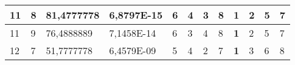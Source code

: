 \documentclass[conference]{IEEEtran}
\begin{document}
\begin{table*}[]
\begin{tabular}{|llll|llllllll|}
\multicolumn{1}{|l|}{11}                                                    & \multicolumn{1}{l|}{8}                                                        & \multicolumn{1}{l|}{81,4777778}                                                   & 6,8797E-15                     & \multicolumn{1}{l|}{6}                                                  & \multicolumn{1}{l|}{4}                                                  & \multicolumn{1}{l|}{3}                                                  & \multicolumn{1}{l|}{8}                                                  & \multicolumn{1}{l|}{\textbf{1}}                                         & \multicolumn{1}{l|}{2}                                                  & \multicolumn{1}{l|}{5}                                                  & 7                          \\ \hline
\multicolumn{1}{|l|}{11}                                                    & \multicolumn{1}{l|}{9}                                                        & \multicolumn{1}{l|}{76,4888889}                                                   & 7,1458E-14                     & \multicolumn{1}{l|}{6}                                                  & \multicolumn{1}{l|}{3}                                                  & \multicolumn{1}{l|}{4}                                                  & \multicolumn{1}{l|}{8}                                                  & \multicolumn{1}{l|}{\textbf{1}}                                         & \multicolumn{1}{l|}{2}                                                  & \multicolumn{1}{l|}{5}                                                  & 7                          \\ \hline
\multicolumn{1}{|l|}{12}                                                    & \multicolumn{1}{l|}{7}                                                        & \multicolumn{1}{l|}{51,7777778}                                                   & 6,4579E-09                     & \multicolumn{1}{l|}{5}                                                  & \multicolumn{1}{l|}{4}                                                  & \multicolumn{1}{l|}{2}                                                  & \multicolumn{1}{l|}{7}                                                  & \multicolumn{1}{l|}{\textbf{1}}                                         & \multicolumn{1}{l|}{3}                                                  & \multicolumn{1}{l|}{6}                                                  & 8                          \\ \hline

\end{tabular}
\end{table*}
\end{document}
